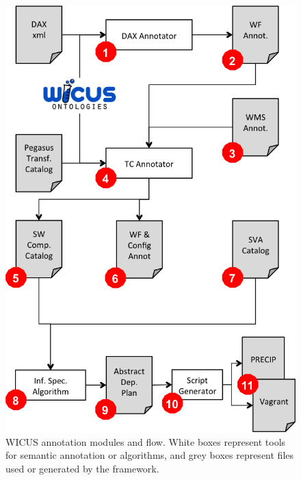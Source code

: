\begin{figure}[!htb]
	\centering
	\includegraphics[width=.8\linewidth]{figures/wicusflow}
	\caption{WICUS annotation modules and flow. White boxes represent tools for semantic annotation or algorithms, and grey boxes represent files used or generated by the framework.}
	\label{fig:wicusflow}
\end{figure}

